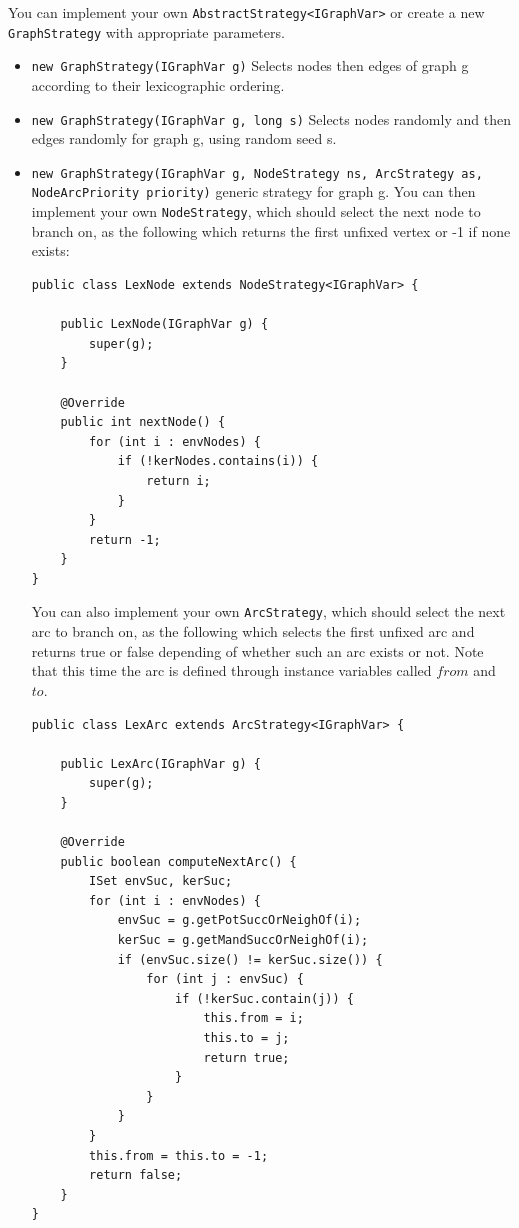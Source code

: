 \documentclass{article}
\begin{document}
You can implement your own \texttt{AbstractStrategy<IGraphVar>} or create a new \texttt{GraphStrategy} with appropriate parameters. 

\begin{itemize}
\item  \texttt{new GraphStrategy(IGraphVar g)} Selects nodes then edges of graph g according to their lexicographic ordering.
\item  \texttt{new GraphStrategy(IGraphVar g, long s)} Selects nodes randomly and then edges randomly for graph g, using random seed s. 
\item  \texttt{new GraphStrategy(IGraphVar g, NodeStrategy ns, ArcStrategy as, NodeArcPriority priority)} generic strategy for graph g. You can then implement your own \texttt{NodeStrategy}, which should select the next node to branch on, as the following which returns the first unfixed vertex or -1 if none exists: 

\begin{lstlisting}
public class LexNode extends NodeStrategy<IGraphVar> {

	public LexNode(IGraphVar g) {
		super(g);
	}

	@Override
	public int nextNode() {
		for (int i : envNodes) {
			if (!kerNodes.contains(i)) {
				return i;
			}
		}
		return -1;
	}
}
\end{lstlisting}

You can also implement your own \texttt{ArcStrategy}, which should select the next arc to branch on, as the following which selects the first unfixed arc and returns true or false depending of whether such an arc exists or not. 
Note that this time the arc is defined through instance variables called $from$ and $to$. 
\begin{lstlisting}
public class LexArc extends ArcStrategy<IGraphVar> {

	public LexArc(IGraphVar g) {
		super(g);
	}

	@Override
	public boolean computeNextArc() {
		ISet envSuc, kerSuc;
		for (int i : envNodes) {
			envSuc = g.getPotSuccOrNeighOf(i);
			kerSuc = g.getMandSuccOrNeighOf(i);
			if (envSuc.size() != kerSuc.size()) {
				for (int j : envSuc) {
					if (!kerSuc.contain(j)) {
						this.from = i;
						this.to = j;
						return true;
					}
				}
			}
		}
		this.from = this.to = -1;
		return false;
	}
}
\end{lstlisting}

\end{itemize}
\end{document}
